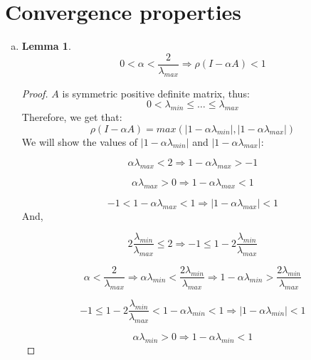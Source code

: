 \documentclass{article}
\newtheorem{lemma}{Lemma}
\begin{document}
\section{Convergence properties}
\begin{enumerate}[(a)] 
\item 
\begin{lemma} \label{a}
\[0 < \alpha < \frac{2}{\lambda_{max}} \Rightarrow \rho(I-\alpha A) < 1\]
\end{lemma}
\begin{proof}
$A$ is symmetric positive definite matrix, thus:
\[0 < \lambda_{min} \le \dots \le \lambda_{max}\]
Therefore, we get that:
\[\rho(I-\alpha A) = max(|1-\alpha \lambda_{min}|, |1-\alpha \lambda_{max}|)\]
We will show the values of $|1-\alpha \lambda_{min}|$ and $|1-\alpha \lambda_{max}|$:

\[ \alpha\lambda_{max}<2 \Rightarrow 1-\alpha\lambda_{max} > -1\]

\[\alpha\lambda_{max}>0 \Rightarrow 1-\alpha\lambda_{max}<1 \]

\[-1 < 1-\alpha \lambda_{max} < 1 \Rightarrow |1-\alpha \lambda_{max}| < 1\]
And,

\[2\frac{\lambda_{min}}{\lambda_{max}} \leq 2 \Rightarrow -1 \leq 1-2\frac{\lambda_{min}}{\lambda_{max}} \]

\[ \alpha < \frac{2}{\lambda_{max}} \Rightarrow \alpha\lambda_{min} < \frac{2\lambda_{min}}{\lambda_{max}} \Rightarrow 1-\alpha\lambda_{min}>\frac{2\lambda_{min}}{\lambda_{max}}\]

\[-1 \leq 1-2 \frac{\lambda_{min} }{\lambda_{max} } < 1 - \alpha \lambda_{min} < 1 \Rightarrow |1-\alpha \lambda_{min}| < 1\]

\[\alpha\lambda_{min}>0 \Rightarrow 1-\alpha\lambda_{min}<1 \]


\end{proof}
\end{enumerate}
\end{document}
